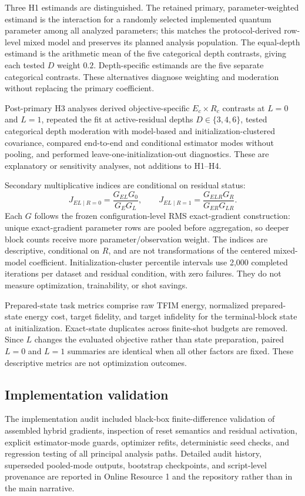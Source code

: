 \documentclass[pdflatex,sn-mathphys-num,Numbered]{sn-jnl}
\begin{document}
Three H1 estimands are distinguished. The retained primary, parameter-weighted estimand is the interaction for a randomly selected implemented quantum parameter among all analyzed parameters; this matches the protocol-derived row-level mixed model and preserves its planned analysis population. The equal-depth estimand is the arithmetic mean of the five categorical depth contrasts, giving each tested $D$ weight $0.2$. Depth-specific estimands are the five separate categorical contrasts. These alternatives diagnose weighting and moderation without replacing the primary coefficient.

Post-primary H3 analyses derived objective-specific $E_c\times R_c$ contrasts at $L=0$ and $L=1$, repeated the fit at active-residual depths $D\in\{3,4,6\}$, tested categorical depth moderation with model-based and initialization-clustered covariance, compared end-to-end and conditional estimator modes without pooling, and performed leave-one-initialization-out diagnostics. These are explanatory or sensitivity analyses, not additions to H1--H4.

Secondary multiplicative indices are conditional on residual status:
\[
J_{EL\mid R=0}=\frac{G_{EL}G_0}{G_EG_L},\qquad
J_{EL\mid R=1}=\frac{G_{ELR}G_R}{G_{ER}G_{LR}}.
\]
Each $G$ follows the frozen configuration-level RMS exact-gradient construction: unique exact-gradient parameter rows are pooled before aggregation, so deeper block counts receive more parameter/observation weight. The indices are descriptive, conditional on $R$, and are not transformations of the centered mixed-model coefficient. Initialization-cluster percentile intervals use 2,000 completed iterations per dataset and residual condition, with zero failures. They do not measure optimization, trainability, or shot savings.

Prepared-state task metrics comprise raw TFIM energy, normalized prepared-state energy cost, target fidelity, and target infidelity for the terminal-block state at initialization. Exact-state duplicates across finite-shot budgets are removed. Since $L$ changes the evaluated objective rather than state preparation, paired $L=0$ and $L=1$ summaries are identical when all other factors are fixed. These descriptive metrics are not optimization outcomes.

\subsection{Implementation validation}

The implementation audit included black-box finite-difference validation of assembled hybrid gradients, inspection of reset semantics and residual activation, explicit estimator-mode guards, optimizer refits, deterministic seed checks, and regression testing of all principal analysis paths. Detailed audit history, superseded pooled-mode outputs, bootstrap checkpoints, and script-level provenance are reported in Online Resource 1 and the repository rather than in the main narrative.
\end{document}
